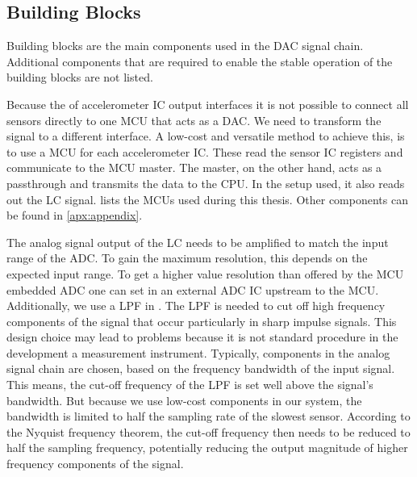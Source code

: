 \subsection{Building Blocks}

Building blocks are the main components used in the \ac{DAC} signal chain. Additional components that are required to enable the stable operation of the building blocks are not listed.

Because the of accelerometer \ac{IC} output interfaces it is not possible to connect all sensors directly to one \ac{MCU} that acts as a \ac{DAC}. We need to transform the signal to a different interface. A low-cost and versatile method to achieve this, is to use a \ac{MCU} for each accelerometer \ac{IC}. These read the sensor \ac{IC} registers and communicate to the \ac{MCU} master. The master, on the other hand, acts as a passthrough and transmits the data to the \ac{CPU}. In the setup used, it also reads out the \ac{LC} signal.  lists the \ac{MCU}s used during this thesis. Other components can be found in \autoref{apx:appendix}.

The analog signal output of the \ac{LC} needs to be amplified to match the input range of the \ac{ADC}. To gain the maximum resolution, this depends on the expected input range. To get a higher value resolution than offered by the \ac{MCU} embedded \ac{ADC} one can set in an external \ac{ADC} \ac{IC} upstream to the \ac{MCU}. Additionally, we use a \ac{LPF} in . The \ac{LPF} is needed to cut off high frequency components of the signal that occur particularly in sharp impulse signals. This design choice may lead to problems because it is not standard procedure in the development a measurement instrument. Typically, components in the analog signal chain are chosen, based on the frequency bandwidth of the input signal. This means, the cut-off frequency of the \ac{LPF} is set well above the signal's bandwidth. But because we use low-cost components in our system, the bandwidth is limited to half the sampling rate of the slowest sensor. According to the Nyquist frequency theorem, the cut-off frequency then needs to be reduced to half the sampling frequency, potentially reducing the output magnitude of higher frequency components of the signal.

